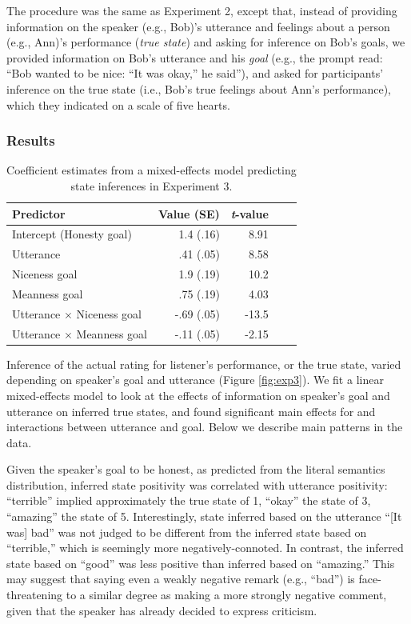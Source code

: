 \documentclass[10pt,letterpaper]{article}
\begin{document}
The procedure was the same as Experiment 2, except that, instead of providing information on the speaker (e.g., Bob)'s utterance and feelings about a person (e.g., Ann)'s performance (\emph{true state}) and asking for inference on Bob's goals, we provided information on Bob's utterance and his \emph{goal} (e.g., the prompt read: ``Bob wanted to be nice: ``It was okay,'' he said''), and asked for participants' inference on the true state (i.e., Bob's true feelings about Ann's performance), which they indicated on a scale of five hearts.

\subsubsection{Results}

\begin{table}[t]
\caption{\label{tab:lmer2}  Coefficient estimates from a mixed-effects model predicting state inferences in Experiment 3.} 
\begin{center} 
\begin{tabular}{l r r r l} 
\hline
Predictor  &  Value (SE) & \emph{t}-value\\
\hline
Intercept (Honesty goal)  & 1.4 (.16) & 8.91 \\
Utterance & .41 (.05) &  8.58 \\
Niceness goal  & 1.9 (.19) & 10.2 \\
Meanness goal & .75 (.19) & 4.03 \\
Utterance $\times$ Niceness goal & -.69 (.05) & -13.5 \\
Utterance $\times$ Meanness goal & -.11 (.05) & -2.15 \\
\hline
\end{tabular} 
\end{center} 
\end{table}

Inference of the actual rating for listener's performance, or the true state, varied depending on speaker's goal and utterance (Figure \ref{fig:exp3}). We fit a linear mixed-effects model to look at the effects of information on speaker's goal and utterance on inferred true states, and found significant main effects for and interactions between utterance and goal. Below we describe main patterns in the data.

Given the speaker's goal to be honest, as predicted from the literal semantics distribution, inferred state positivity was correlated with utterance positivity: ``terrible'' implied approximately the true state of 1, ``okay'' the state of 3, ``amazing'' the state of 5. Interestingly, state inferred based on the utterance ``[It was] bad'' was not judged to be different from the inferred state based on ``terrible,'' which is seemingly more negatively-connoted. In contrast, the inferred state based on ``good'' was less positive than inferred based on ``amazing.'' This may suggest that saying even a weakly negative remark (e.g., ``bad'') is face-threatening to a similar degree as making a more strongly negative comment, given that the speaker has already decided to express criticism.
\end{document}

